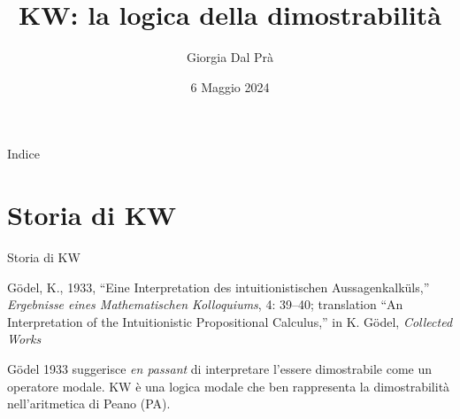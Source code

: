 \documentclass{beamer}
\title{KW: la logica della dimostrabilità}
\author{Giorgia Dal Prà}
\institute{Alma Mater Studiorum -- Univesità di Bologna}
\date{6 Maggio 2024}
\begin{document}
\begin{frame}
\maketitle   
\end{frame}

\begin{frame}{Indice}
    \tableofcontents
\end{frame}

\section{Storia di KW}
\begin{frame}{Storia di KW}
\begin{thebibliography}{1}
    \bibitem{} Gödel, K., 1933, “Eine Interpretation des intuitionistischen Aussagenkalküls,” \textit{Ergebnisse eines Mathematischen Kolloquiums}, 4: 39–40; translation “An Interpretation of the Intuitionistic  Propositional Calculus,” in K. Gödel, \textit{Collected Works}
\end{thebibliography}
 G\"odel 1933 suggerisce \textit{en passant} di interpretare l'essere dimostrabile come un operatore modale.\newline\newline
KW è una logica modale che ben rappresenta la dimostrabilità nell'aritmetica di Peano (PA).

\end{frame}
\end{document}

